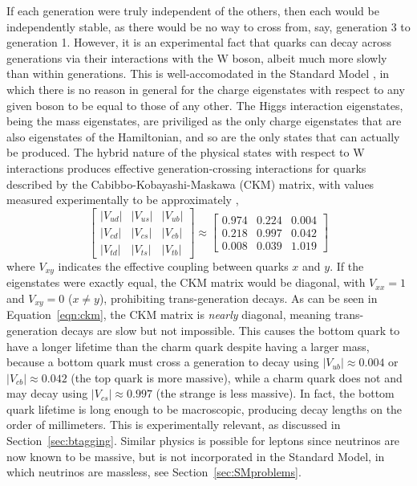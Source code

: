   If each generation were truly independent of the others, then each would be independently stable, as there would be no way to cross from, say, generation 3 to generation 1.
  However, it is an experimental fact that quarks can decay across generations via their interactions with the W boson, albeit much more slowly than within generations.
  This is well-accomodated in the Standard Model \cite{cabibbo,ckm}, in which there is no reason in general for the charge eigenstates with respect to any given boson to be equal to those of any other.
  The Higgs interaction eigenstates, being the mass eigenstates, are priviliged as the only charge eigenstates that are also eigenstates of the Hamiltonian, and so are the only states that can actually be produced.
  The hybrid nature of the physical states with respect to W interactions produces effective generation-crossing interactions for quarks described by the Cabibbo-Kobayashi-Maskawa (CKM) matrix, with values measured experimentally to be approximately \cite{pdg},
  \begin{equation} \label{eqn:ckm}
    \begin{bmatrix} 
      |V_{ud}| & |V_{us}| & |V_{ub}| \\
      |V_{cd}| & |V_{cs}| & |V_{cb}| \\
      |V_{td}| & |V_{ts}| & |V_{tb}| 
    \end{bmatrix}
\approx
    \begin{bmatrix} 
      0.974 & 0.224 & 0.004 \\
      0.218 & 0.997 & 0.042 \\
      0.008 & 0.039 & 1.019
    \end{bmatrix}
  \end{equation}
  where $V_{xy}$ indicates the effective coupling between quarks $x$ and $y$.
  If the eigenstates were exactly equal, the CKM matrix would be diagonal, with $V_{xx} = 1$ and $V_{xy} = 0$ ($x \neq y$), prohibiting trans-generation decays.
  As can be seen in Equation~\ref{eqn:ckm}, the CKM matrix is {\it nearly} diagonal, meaning trans-generation decays are slow but not impossible.
  This causes the bottom quark to have a longer lifetime than the charm quark despite having a larger mass, because a bottom quark must cross a generation to decay using $|V_{ub}| \approx 0.004$ or $|V_{cb}| \approx 0.042$ (the top quark is more massive), while a charm quark does not and may decay using $|V_{cs}| \approx 0.997$ (the strange is less massive).
  In fact, the bottom quark lifetime is long enough to be macroscopic, producing decay lengths on the order of millimeters.
  This is experimentally relevant, as discussed in Section~\ref{sec:btagging}.
  Similar physics is possible for leptons since neutrinos are now known to be massive, but is not incorporated in the Standard Model, in which neutrinos are massless, see Section~\ref{sec:SMproblems}.

